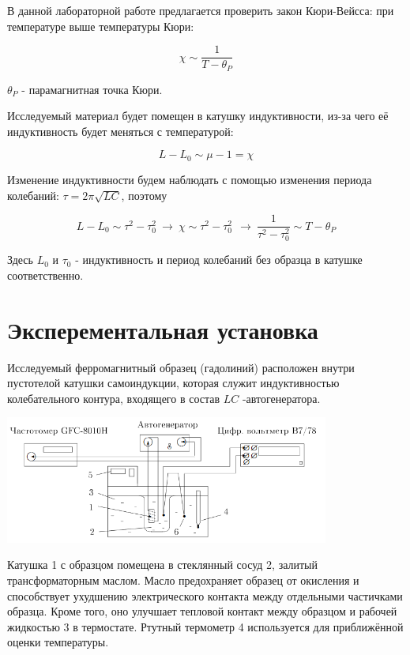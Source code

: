 \documentclass[a4paper,12pt]{article}
\begin{document}
В данной лабораторной работе предлагается проверить закон Кюри-Вейсса: при температуре выше температуры Кюри:

\begin{equation*}
    \chi \sim \frac{1}{T - \theta_P}
\end{equation*}

$\theta_P$ - парамагнитная точка Кюри.

Исследуемый материал будет помещен в катушку индуктивности, из-за чего её индуктивность будет меняться с температурой:

\begin{equation*}
    L - L_0 \sim \mu - 1 = \chi
\end{equation*}

Изменение индуктивности будем наблюдать с помощью изменения периода колебаний: $\tau = 2\pi\sqrt{LC}$, поэтому 

\begin{equation*}
    L - L_0 \sim \tau^2 - \tau_0^2 \ \rightarrow \ \chi \sim \tau^2 - \tau_0^2 \ \ \rightarrow \ \frac{1}{\tau^2 - \tau_0^2} \sim T - \theta_P
\end{equation*}

Здесь $L_0$ и $\tau_0$ - индуктивность и период колебаний без образца в катушке соответственно.

\section{Эксперементальная установка}

Исследуемый ферромагнитный образец (гадолиний) расположен внутри пустотелой катушки самоиндукции, которая служит индуктивностью колебательного контура, входящего в состав $L C$ -автогенератора.

\begin{center}
    \includegraphics[width=0.8\textwidth]{ustan.png}
    \label{pic:1}
\end{center}

Катушка 1 с образцом помещена в стеклянный сосуд 2, залитый трансформаторным маслом. Масло предохраняет образец от окисления и способствует ухудшению электрического контакта между отдельными частичками образца. Кроме того, оно улучшает тепловой контакт между образцом и рабочей жидкостью 3 в термостате. Ртутный термометр 4 используется для приближённой оценки температуры.
\end{document}
